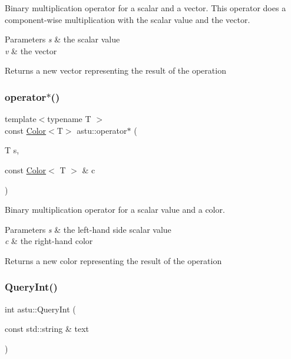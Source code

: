 Binary multiplication operator for a scalar and a vector. This operator does a component-\/wise multiplication with the scalar value and the vector.


\begin{DoxyParams}{Parameters}
{\em s} & the scalar value \\
\hline
{\em v} & the vector \\
\hline
\end{DoxyParams}
\begin{DoxyReturn}{Returns}
a new vector representing the result of the operation 
\end{DoxyReturn}
\mbox{\label{namespaceastu_aab156e193f46ce5e45fb0b173c3ef878}} 
\subsubsection{\texorpdfstring{operator$\ast$()}{operator*()}\hspace{0.1cm}{\footnotesize\ttfamily [2/2]}}
{\footnotesize\ttfamily template$<$typename T $>$ \\
const \hyperlink{classastu_1_1Color}{Color}$<$T$>$ astu\+::operator$\ast$ (\begin{DoxyParamCaption}\item[{T}]{s,  }\item[{const \hyperlink{classastu_1_1Color}{Color}$<$ T $>$ \&}]{c }\end{DoxyParamCaption})\hspace{0.3cm}{\ttfamily [inline]}}

Binary multiplication operator for a scalar value and a color.


\begin{DoxyParams}{Parameters}
{\em s} & the left-\/hand side scalar value \\
\hline
{\em c} & the right-\/hand color \\
\hline
\end{DoxyParams}
\begin{DoxyReturn}{Returns}
a new color representing the result of the operation 
\end{DoxyReturn}
\mbox{\label{namespaceastu_ad54c0019fb3e7671e9b32db9cb3d7ebe}} 
\subsubsection{\texorpdfstring{Query\+Int()}{QueryInt()}}
{\footnotesize\ttfamily int astu\+::\+Query\+Int (\begin{DoxyParamCaption}\item[{const std\+::string \&}]{text }\end{DoxyParamCaption})}

